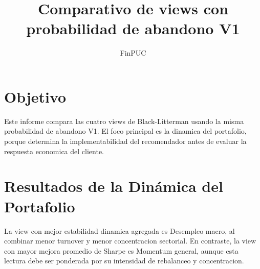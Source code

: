 \documentclass[11pt]{article}
\title{Comparativo de views con probabilidad de abandono V1}
\author{FinPUC}
\date{}
\begin{document}
\maketitle
\section{Objetivo}
Este informe compara las cuatro views de Black-Litterman usando la misma probabilidad de abandono V1. El foco principal es la dinamica del portafolio, porque determina la implementabilidad del recomendador antes de evaluar la respuesta economica del cliente.
\section{Resultados de la Dinámica del Portafolio}
\begin{table}[H]
\centering
{}
\caption{Comparacion de dinamica de portafolio entre views con abandono V1.}
\label{tab:comparativo_v1_dinamica}
\end{table}

La view con mejor estabilidad dinamica agregada es Desempleo macro, al combinar menor turnover y menor concentracion sectorial. En contraste, la view con mayor mejora promedio de Sharpe es Momentum general, aunque esta lectura debe ser ponderada por su intensidad de rebalanceo y concentracion.
\end{document}
